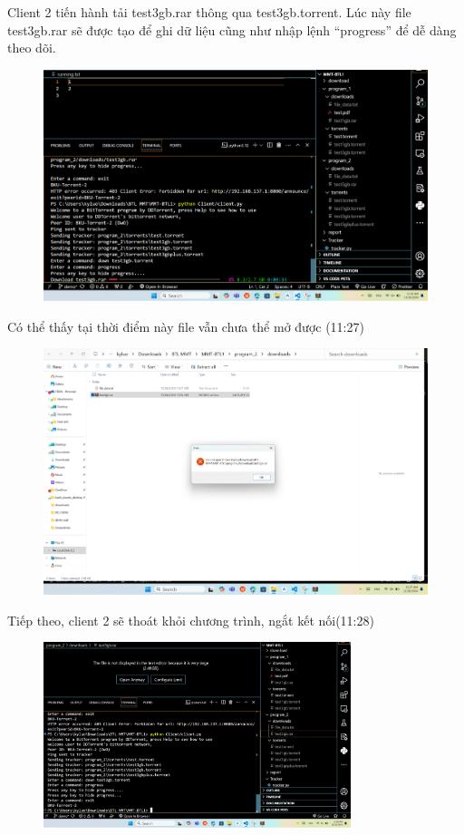 \documentclass[a4paper]{article}
\begin{document}
Client 2 tiến hành tải test3gb.rar thông qua test3gb.torrent. Lúc này file test3gb.rar sẽ được tạo để ghi dữ liệu cũng như nhập lệnh “progress” để dễ dàng theo dõi.
\begin{figure}[H]
    \centering
    \includegraphics[width=1\textwidth]{images/10.png}
    \captionsetup{labelformat=empty}
\end{figure}
Có thể thấy tại thời điểm này file vẫn chưa thể mở được (11:27)
\begin{figure}[H]
    \centering
    \includegraphics[width=1\textwidth]{images/11.png}
    \captionsetup{labelformat=empty}
\end{figure}
Tiếp theo, client 2 sẽ thoát khỏi chương trình, ngắt kết nối(11:28)
\begin{figure}[H]
    \centering
    \includegraphics[width=0.8\textwidth]{images/12.png}
    \captionsetup{labelformat=empty}
\end{figure}
\end{document}
